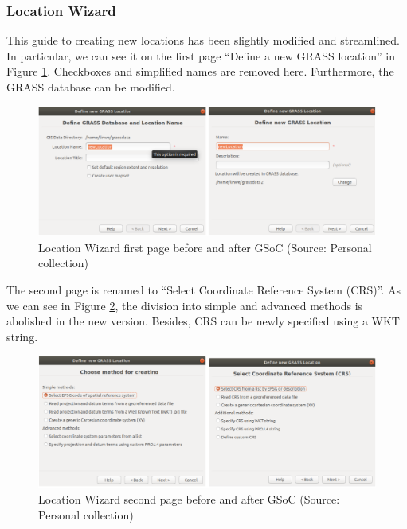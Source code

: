 \documentclass[a4paper,10pt,twoside]{article}
\begin{document}
\newpage
\vspace*{-1cm}
\subsubsection{Location Wizard}

This guide to creating new locations has been slightly modified and streamlined. In particular, we can see it on the first page ``Define a new GRASS location'' in Figure \ref{fig:loc_wiz_1}. Checkboxes and simplified names are removed here. Furthermore, the GRASS database can be modified.

\vspace{0.3cm}
\begin{figure}[hbt!] 
\begin{center}
\includegraphics[width=17cm]{../pictures/loc_wiz_1.png} 
\caption[Location Wizard first page before and after GSoC]{Location Wizard first page before and after GSoC (Source: Personal collection)}
\label{fig:loc_wiz_1}
\end{center}
\end{figure}

\noindent The second page is renamed to ``Select Coordinate Reference System (CRS)''. As we can see in Figure \ref{fig:loc_wiz_2}, the division into simple and advanced methods is abolished in the new version. Besides, CRS can be newly specified using a WKT string.

\vspace{0.3cm}
\begin{figure}[hbt!] 
\begin{center}
\includegraphics[width=17cm]{../pictures/loc_wiz_2.png} 
\caption[Location Wizard second page before and after GSoC]{Location Wizard second page before and after GSoC (Source: Personal collection)}
\label{fig:loc_wiz_2}
\end{center}
\end{figure}
\end{document}
